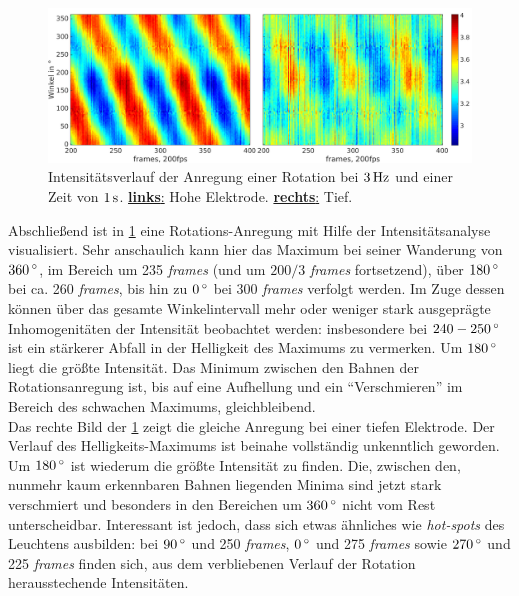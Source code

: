\documentclass[numbers=noenddot,a4paper]{scrartcl}
\newcommand{\degree}{^\circ}
\newcommand{\tilt}[1]{\textit{#1}}
\newcommand{\fett}[1]{\textbf{#1}}
\begin{document}
				\begin{figure}[!t]
					\centering\vspace{-0.5cm}
					\includegraphics[width=\textwidth,height=0.35\textwidth]{figs/auswertung/randrotathochutief3Hz1sekwink.png}
					\caption{Intensitätsverlauf der Anregung einer Rotation bei $\unit[3]{Hz}$ und einer Zeit von $\unit[1]{s}$. \underline{\fett{links}:} Hohe Elektrode. \underline{\fett{rechts}:} Tief.}
					\label{img:randhochutiefrotat}
				\end{figure}

			Abschließend ist in \ref{img:randhochutiefrotat} eine Rotations-Anregung mit Hilfe der Intensitätsanalyse visualisiert. Sehr anschaulich kann hier das Maximum bei seiner Wanderung von $\unit[360]{\degree}$, im Bereich um 235 \tilt{frames} (und um $200/3$ \tilt{frames} fortsetzend), über $\unit[180]{\degree}$ bei ca. 260 \tilt{frames}, bis hin zu $\unit[0]{\degree}$ bei 300 \tilt{frames} verfolgt werden. Im Zuge dessen können über das gesamte Winkelintervall mehr oder weniger stark ausgeprägte Inhomogenitäten der Intensität beobachtet werden: insbesondere bei $\unit[240-250]{\degree}$ ist ein stärkerer Abfall in der Helligkeit des Maximums zu vermerken. Um $\unit[180]{\degree}$ liegt die größte Intensität. Das Minimum zwischen den Bahnen der Rotationsanregung ist, bis auf eine Aufhellung und ein "`Verschmieren"' im Bereich des schwachen Maximums, gleichbleibend.\\
			Das rechte Bild der \ref{img:randhochutiefrotat} zeigt die gleiche Anregung bei einer tiefen Elektrode. Der Verlauf des Helligkeits-Maximums ist beinahe vollständig unkenntlich geworden. Um $\unit[180]{\degree}$ ist wiederum die größte Intensität zu finden. Die, zwischen den, nunmehr kaum erkennbaren Bahnen liegenden Minima sind jetzt stark verschmiert und besonders in den Bereichen um $\unit[360]{\degree}$ nicht vom Rest unterscheidbar. Interessant ist jedoch, dass sich etwas ähnliches wie \tilt{hot-spots} des Leuchtens ausbilden: bei $\unit[90]{\degree}$ und 250 \tilt{frames}, $\unit[0]{\degree}$ und 275 \tilt{frames} sowie $\unit[270]{\degree}$ und 225 \tilt{frames} finden sich, aus dem verbliebenen Verlauf der Rotation herausstechende Intensitäten. 
\end{document}
